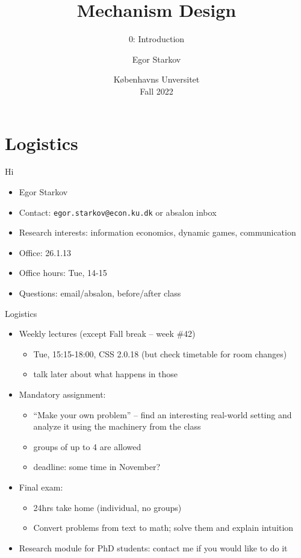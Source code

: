 \documentclass[english,10pt
,aspectratio=169
]{beamer}
\title{Mechanism Design}
\subtitle{0: Introduction}
\author{Egor Starkov}
\date{K{\o}benhavns Unversitet \\
	Fall 2022}
\begin{document}
	\frame[plain]{\titlepage}






\section{Logistics}

\begin{frame}{Hi}
	\begin{itemize}
		\item Egor Starkov
		\item Contact: \texttt{egor.starkov@econ.ku.dk} or absalon inbox
		\item Research interests: information economics, dynamic games, communication
		\item Office: 26.1.13
		\item Office hours: Tue, 14-15
		\item Questions: email/absalon, before/after class
	\end{itemize}
\end{frame}


\begin{frame}{Logistics}
	\begin{itemize}
		\item Weekly lectures (except Fall break -- week \#42)
		\begin{itemize}
			\item Tue, 15:15-18:00, CSS 2.0.18 (but check timetable for room changes)
			\item talk later about what happens in those
		\end{itemize}
		
		\pause
		\item Mandatory assignment:
		\begin{itemize}
			\item ``Make your own problem'' -- find an interesting real-world setting and analyze it using the machinery from the class
			\item groups of up to 4 are allowed
			\item deadline: some time in November?
		\end{itemize}
		
		\pause
		\item Final exam:
		\begin{itemize}
			\item 24hrs take home (individual, no groups)
			\item Convert problems from text to math; solve them and explain intuition
		\end{itemize}
		
		\pause
		\item Research module for PhD students: contact me if you would like to do it
	\end{itemize}
\end{frame}
\end{document}
